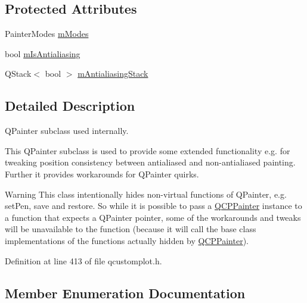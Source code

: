 \subsection*{Protected Attributes}
\begin{DoxyCompactItemize}
\item 
Painter\+Modes \hyperlink{class_q_c_p_painter_af5d1d6e5df0adbc7de5633250fb3396c}{m\+Modes}
\item 
bool \hyperlink{class_q_c_p_painter_a7055085da176aee0f6b23298f1003d08}{m\+Is\+Antialiasing}
\item 
Q\+Stack$<$ bool $>$ \hyperlink{class_q_c_p_painter_a0189e641bbf7dc31ac15aef7b36501fa}{m\+Antialiasing\+Stack}
\end{DoxyCompactItemize}


\subsection{Detailed Description}
Q\+Painter subclass used internally. 

This Q\+Painter subclass is used to provide some extended functionality e.\+g. for tweaking position consistency between antialiased and non-\/antialiased painting. Further it provides workarounds for Q\+Painter quirks.

\begin{DoxyWarning}{Warning}
This class intentionally hides non-\/virtual functions of Q\+Painter, e.\+g. set\+Pen, save and restore. So while it is possible to pass a \hyperlink{class_q_c_p_painter}{Q\+C\+P\+Painter} instance to a function that expects a Q\+Painter pointer, some of the workarounds and tweaks will be unavailable to the function (because it will call the base class implementations of the functions actually hidden by \hyperlink{class_q_c_p_painter}{Q\+C\+P\+Painter}). 
\end{DoxyWarning}


Definition at line 413 of file qcustomplot.\+h.



\subsection{Member Enumeration Documentation}
\hypertarget{class_q_c_p_painter_a156cf16444ff5e0d81a73c615fdb156d}{}
